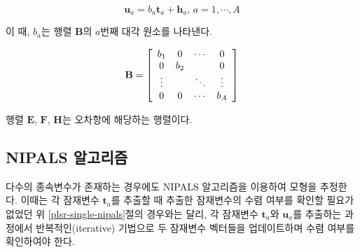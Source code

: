 \documentclass[
]{book}
\begin{document}
\begin{equation*}
\mathbf{u}_a = b_a \mathbf{t}_a + \mathbf{h}_a, \, a = 1, \cdots, A
\end{equation*}

이 때, \(b_a\)는 행렬 \(\mathbf{B}\)의 \(a\)번째 대각 원소를 나타낸다.

\[\mathbf{B} = \left[ \begin{array}{c c c c}
b_{1} & 0 & \cdots & 0\\
0 & b_{2} &  & 0\\
\vdots &  & \ddots & \vdots \\
0 & 0 & \cdots & b_{A}
\end{array} \right]
\]

행렬 \(\mathbf{E}\), \(\mathbf{F}\), \(\mathbf{H}\)는 오차항에 해당하는 행렬이다.

\hypertarget{plsr-multivariate-nipals}{%
\subsection{NIPALS 알고리즘}\label{plsr-multivariate-nipals}}

다수의 종속변수가 존재하는 경우에도 NIPALS 알고리즘을 이용하여 모형을 추정한다. 이때는 각 잠재변수 \(\mathbf{t}_a\)를 추출할 때 추출한 잠재변수의 수렴 여부를 확인할 필요가 없었던 위 \ref{plsr-single-nipals}절의 경우와는 달리, 각 잠재변수 \(\mathbf{t}_a\)와 \(\mathbf{u}_a\)를 추출하는 과정에서 반복적인(iterative) 기법으로 두 잠재변수 벡터들을 업데이트하며 수렴 여부를 확인하여야 한다.
\end{document}

